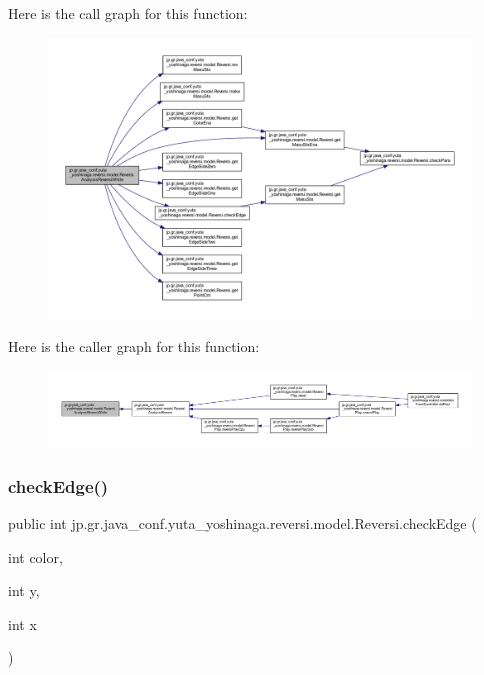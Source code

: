 Here is the call graph for this function\+:\nopagebreak
\begin{figure}[H]
\begin{center}
\leavevmode
\includegraphics[width=350pt]{classjp_1_1gr_1_1java__conf_1_1yuta__yoshinaga_1_1reversi_1_1model_1_1_reversi_a519adbc5ec3bf5433fdb79bf8049cc75_cgraph}
\end{center}
\end{figure}
Here is the caller graph for this function\+:\nopagebreak
\begin{figure}[H]
\begin{center}
\leavevmode
\includegraphics[width=350pt]{classjp_1_1gr_1_1java__conf_1_1yuta__yoshinaga_1_1reversi_1_1model_1_1_reversi_a519adbc5ec3bf5433fdb79bf8049cc75_icgraph}
\end{center}
\end{figure}
\mbox{\label{classjp_1_1gr_1_1java__conf_1_1yuta__yoshinaga_1_1reversi_1_1model_1_1_reversi_a4874c6523adfdfd42dfbd625f5e3fe7a}} 
\subsubsection{\texorpdfstring{check\+Edge()}{checkEdge()}}
{\footnotesize\ttfamily public int jp.\+gr.\+java\+\_\+conf.\+yuta\+\_\+yoshinaga.\+reversi.\+model.\+Reversi.\+check\+Edge (\begin{DoxyParamCaption}\item[{int}]{color,  }\item[{int}]{y,  }\item[{int}]{x }\end{DoxyParamCaption})}



